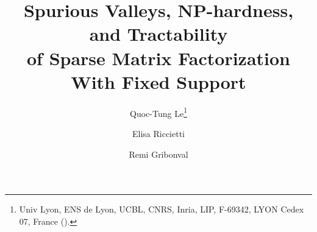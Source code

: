 
\newcommand\intset[1]{\llbracket #1 \rrbracket}
\newcommand\col[1]{{\bullet, {#1}}}
\newcommand\row[1]{{{#1}, \bullet}}
\newcommand\RG[1]{\textcolor{black}{#1}}
\newcommand\ER[1]{\textcolor{blue}{#1}}
\newcommand\TL[1]{\textcolor{purple}{#1}}
\newcommand\COMM[1]{\textcolor{red}{#1}}
\newcommand\GG[1]{\textcolor{black}{#1}}
\newcommand\mS{\mc{S}}
\newcommand{\vertrule}[1][1.5ex]{\rule{1.0pt}{#1}}

\newcommand\mRG[1]{\marginpar{\tiny\RG{#1}}}

\title{Spurious Valleys, NP-hardness, and Tractability \\
	of Sparse Matrix Factorization With Fixed Support}

\author{Quoc-Tung Le\thanks{Univ Lyon, ENS de Lyon, UCBL, CNRS, Inria, LIP, F-69342, LYON Cedex 07, France ().}
	\and Elisa Riccietti\footnotemark[1]
	\and Remi Gribonval\footnotemark[1]}


\usepackage{amsopn}
\DeclareMathOperator{\diag}{diag}

